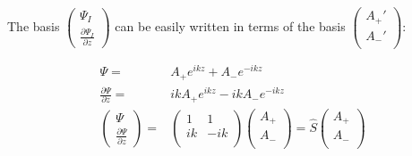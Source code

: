 			The basis	$\left(\begin{smallmatrix}	
				\Psi_{I} \\
				\frac{\partial \Psi_{I}}{\partial z}
			\end{smallmatrix}\right)$ can be easily written in terms of the basis $\left(\begin{smallmatrix}
				A_+' \\
				A_-' \\
			\end{smallmatrix}\right)$:
			
			\begin{align}
				\Psi =& A_+ e^{ikz} + A_- e^{-ikz} \\
				\frac{\partial \Psi}{\partial z} =& ikA_+ e^{ikz} - ikA_- e^{-ikz} \\
				\begin{pmatrix}	
					\Psi \\
					\frac{\partial \Psi}{\partial z}
				\end{pmatrix} =& 
				\begin{pmatrix}
					1 & 1 \\
					ik & -ik \\
				\end{pmatrix}
				\begin{pmatrix}
					A_+ \\
					A_- \\
				\end{pmatrix} = \hat{S} 
				\begin{pmatrix}
					A_+ \\
					A_- \\
				\end{pmatrix}
			\end{align}
			
